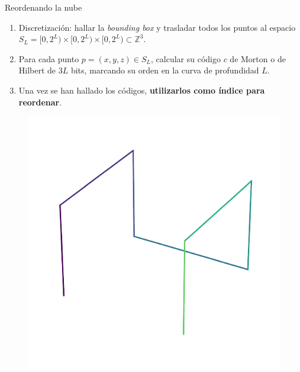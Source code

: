 \documentclass[aspectratio=169]{beamer}
\begin{document}
\begin{frame}{Reordenando la nube}
    \begin{enumerate}
        \item Discretización: hallar la \textit{bounding box} y trasladar todos los puntos al espacio $S_L = [0,2^L) \times [0, 2^L) \times [0, 2^L) \subset \mathbb{Z}^3$.
        \item Para cada punto $p =(x,y,z) \in S_L$, calcular su código $c$ de Morton o de Hilbert de $3L$ bits, marcando su orden en la curva de profundidad $L$.
        \item Una vez se han hallado los códigos, \textbf{utilizarlos como índice para reordenar}.
    \end{enumerate}

    \pause
    \vspace{-0.5em}
    \begin{figure}[ht]
      \centering
      \begin{minipage}{0.3\linewidth}
        \centering
        \includegraphics[width=0.85\linewidth]{img/plot_regular-2_hilbert.pdf}
      \end{minipage}
      \hfill
      \begin{minipage}{0.3\linewidth}
        \centering

\end{minipage}
\end{figure}
\end{frame}
\end{document}
